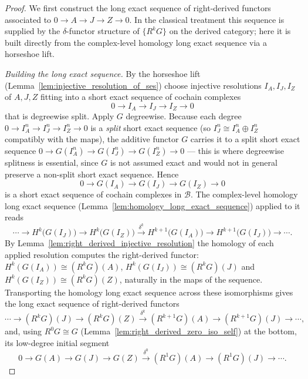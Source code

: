\begin{proof}
    \leanok
  We first construct the long exact sequence of right-derived functors associated
  to \(0 \to A \to J \to Z \to 0\). In the classical treatment this sequence is
  supplied by the \(\delta\)-functor structure of \(\{R^k G\}\) on the derived
  category; here it is built directly from the complex-level homology long exact
  sequence via a horseshoe lift.

  \emph{Building the long exact sequence.} By the horseshoe lift
  (Lemma~\ref{lem:injective_resolution_of_ses}) choose injective resolutions
  \(I_A, I_J, I_Z\) of \(A, J, Z\) fitting into a short exact sequence of cochain
  complexes
  \[
    0 \longrightarrow I_A \longrightarrow I_J \longrightarrow I_Z \longrightarrow 0
  \]
  that is degreewise split. Apply \(G\) degreewise. Because each degree
  \(0 \to I_A^n \to I_J^n \to I_Z^n \to 0\) is a \emph{split} short exact sequence
  (so \(I_J^n \cong I_A^n \oplus I_Z^n\) compatibly with the maps), the additive
  functor \(G\) carries it to a split short exact sequence
  \(0 \to G(I_A^n) \to G(I_J^n) \to G(I_Z^n) \to 0\) --- this is where degreewise
  splitness is essential, since \(G\) is not assumed exact and would not in general
  preserve a non-split short exact sequence. Hence
  \[
    0 \longrightarrow G(I_A) \longrightarrow G(I_J) \longrightarrow G(I_Z)
      \longrightarrow 0
  \]
  is a short exact sequence of cochain complexes in \(\mathcal{B}\). The
  complex-level homology long exact sequence
  (Lemma~\ref{lem:homology_long_exact_sequence}) applied to it reads
  \[
    \cdots \to H^k\bigl(G(I_J)\bigr) \to H^k\bigl(G(I_Z)\bigr)
      \xrightarrow{\ \delta^k\ } H^{k+1}\bigl(G(I_A)\bigr)
      \to H^{k+1}\bigl(G(I_J)\bigr) \to \cdots .
  \]
  By Lemma~\ref{lem:right_derived_injective_resolution} the homology of each applied
  resolution computes the right-derived functor:
  \(H^k(G(I_A)) \cong (R^k G)(A)\), \(H^k(G(I_J)) \cong (R^k G)(J)\) and
  \(H^k(G(I_Z)) \cong (R^k G)(Z)\), naturally in the maps of the sequence. Transporting
  the homology long exact sequence across these isomorphisms gives the long exact
  sequence of right-derived functors
  \[
    \cdots \to (R^k G)(J) \to (R^k G)(Z)
      \xrightarrow{\ \delta^k\ } (R^{k+1} G)(A) \to (R^{k+1} G)(J) \to \cdots,
  \]
  and, using \(R^0 G \cong G\) (Lemma~\ref{lem:right_derived_zero_iso_self}) at the
  bottom, its low-degree initial segment
  \[
    0 \to G(A) \to G(J) \to G(Z)
      \xrightarrow{\ \delta^0\ } (R^1 G)(A) \to (R^1 G)(J) \to \cdots .
  \]


\end{proof}
